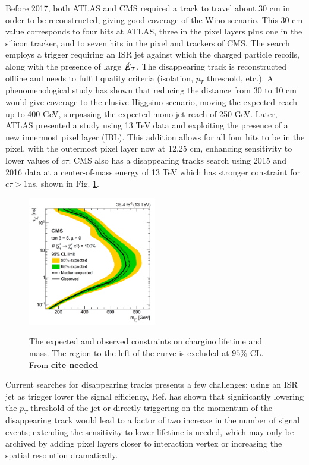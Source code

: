 Before 2017, both ATLAS and CMS  required a track to travel about 30 cm in order to be reconstructed, giving good coverage of the Wino scenario. This 30 cm value corresponds to four hits at ATLAS, three in the pixel layers plus one in the silicon tracker, and to seven hits in the pixel and trackers of CMS. The search employs a trigger requiring an ISR jet against which the charged particle recoils, along with the presence of large $\slashed{E}_T$. The disappearing track is reconstructed offline and needs to fulfill quality criteria (isolation, $p_T$ threshold, etc.). A phenomenological study has shown that reducing the distance from 30 to 10 cm would give coverage to the elusive Higgsino scenario, moving the expected reach up to 400 GeV, surpassing the expected mono-jet reach of 250 GeV. Later, ATLAS presented a study using 13 TeV data and exploiting the presence of a new innermost pixel layer (IBL). This addition allows for all four hits to be in the pixel, with the outermost pixel layer now at 12.25 cm, enhancing sensitivity to lower values of $c\tau$. CMS also has a disappearing tracks search using 2015 and 2016 data at a center-of-mass energy of 13 TeV which has stronger constraint for $c\tau > 1$ns, shown in Fig. \ref{fig:CMSDisappearingTrack2018}.

\begin{figure}[!htbp]
    \centering
    \caption{The expected and observed constraints on chargino lifetime and mass. The region to the left of the curve is excluded at $95\%$ CL. From \textbf{cite needed}}
    \includegraphics[width=0.5\textwidth]{fig/CMSDisappearingTrack2018.png}
    \label{fig:CMSDisappearingTrack2018}
\end{figure} 

Current searches for disappearing tracks presents a few challenges: using an ISR jet as trigger lower the signal efficiency, Ref.\cite{DisappearingTrackWindow} has shown that significantly lowering the $p_T$ threshold of the jet or directly triggering on the momentum of the disappearing track would lead to a factor of two increase in the number of signal events; extending the sensitivity to lower lifetime is needed, which may only be archived by adding pixel layers closer to interaction vertex or increasing the spatial resolution dramatically. \\


